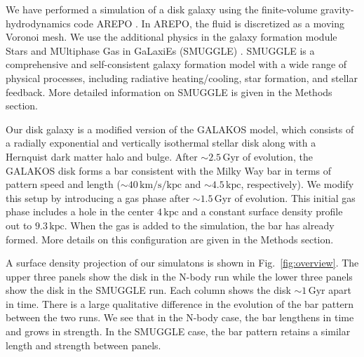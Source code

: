 \documentclass{natureprintstyle}
\begin{document}
\vspace{1cm}



We have performed a simulation of a disk galaxy using the finite-volume
gravity-hydrodynamics code AREPO \cite{2010MNRAS.401..791S}. In AREPO, the
fluid is discretized as a moving Voronoi mesh. We use the additional physics
in the galaxy formation module Stars and MUltiphase Gas in GaLaxiEs (SMUGGLE)
\cite{2019MNRAS.489.4233M}. SMUGGLE is a comprehensive and self-consistent
galaxy formation model with a wide range of physical processes, including
radiative heating/cooling, star formation, and stellar feedback. More detailed
information on SMUGGLE is given in the Methods section.

Our disk galaxy is a modified version of the GALAKOS
model\cite{2020ApJ...890..117D}, which consists of a radially exponential and
vertically isothermal stellar disk along with a
Hernquist\cite{1990ApJ...356..359H} dark matter halo and bulge. After
$\sim2.5\,\textrm{Gyr}$ of evolution, the GALAKOS disk forms a bar consistent
with the Milky Way bar in terms of pattern speed and length
($\sim40\,\textrm{km}/\textrm{s}/\textrm{kpc}$ and $\sim4.5\,\textrm{kpc}$,
respectively). We modify this setup by introducing a gas phase after $\sim
1.5\,\textrm{Gyr}$ of evolution. This initial gas phase includes a hole in the
center $4\,\textrm{kpc}$ and a constant surface density profile out to
$9.3\,\textrm{kpc}$. When the gas is added to the simulation, the bar has
already formed. More details on this configuration are given in the Methods
section.

A surface density projection of our simulatons is shown in
Fig.~\ref{fig:overview}. The upper three panels show the disk in the N-body
run while the lower three panels show the disk in the SMUGGLE run. Each column
shows the disk $\sim1\,\textrm{Gyr}$ apart in time. There is a large qualitative
difference in the evolution of the bar pattern between the two runs. We see
that in the N-body case, the bar lengthens in time and grows in strength. In
the SMUGGLE case, the bar pattern retains a similar length and strength
between panels.
\end{document}
